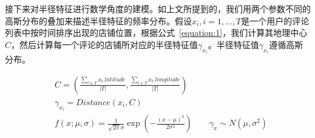 接下来对半径特征进行数学角度的建模。如上文所提到的，我们用两个参数不同的高斯分布的叠加来描述半径特征的频率分布。假设$x_i, i = 1,...,T$是一个用户的评论列表中按时间排序出现的店铺位置，根据公式~\eqref{equation:1}，我们计算其地理中心$C$，然后计算每一个评论的店铺所对应的半径特征值$\gamma_{x_i}$。半径特征值$\gamma_{x_i}$遵循高斯分布。


\begin{equation}
\label{equation:1}
\begin{aligned}
& C = (\frac{\sum_{t \in T}{x_t.latitude}}{|T|}, \frac{\sum_{t \in T}{x_t.longitude}}{|T|})\\
& \gamma_{x_i} = Distance(x_i, C)\\
& f(x;\mu, \sigma) = \frac{1}{\sqrt{2\pi}\sigma}\exp{(-\frac{(x-\mu)^2}{2\sigma^2})} \qquad
\gamma_{x}\sim N(\mu, \sigma^2) \\
\end{aligned}
\end{equation}